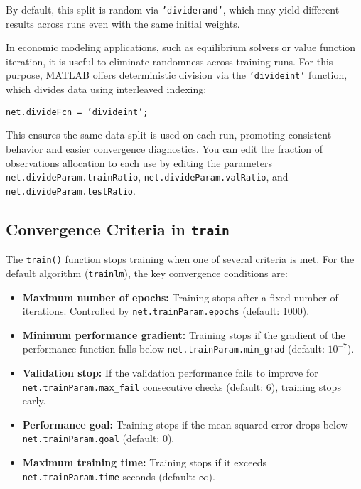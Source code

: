 \documentclass[a4paper,12pt]{article}
\newcommand{\code}[1]{\texttt{#1}}
\begin{document}
By default, this split is random via \code{'dividerand'}, which may yield different results across runs even with the same initial weights.


In economic modeling applications, such as equilibrium solvers or value function iteration, it is useful to eliminate randomness across training runs. For this purpose, MATLAB offers deterministic division via the \code{'divideint'} function, which divides data using interleaved indexing:

\code{net.divideFcn = 'divideint';}

This ensures the same data split is used on each run, promoting consistent behavior and easier convergence diagnostics. You can edit the fraction of observations allocation to each use by editing the parameters \code{net.divideParam.trainRatio}, \code{net.divideParam.valRatio}, and \code{net.divideParam.testRatio}. 


\subsection{Convergence Criteria in \code{train}}

The \code{train()} function stops training when one of several criteria is met. For the default algorithm (\code{trainlm}), the key convergence conditions are:

\begin{itemize}
  \item \textbf{Maximum number of epochs:} Training stops after a fixed number of iterations. Controlled by \code{net.trainParam.epochs} (default: 1000).
  \item \textbf{Minimum performance gradient:} Training stops if the gradient of the performance function falls below \code{net.trainParam.min\_grad} (default: \(10^{-7}\)).
  \item \textbf{Validation stop:} If the validation performance fails to improve for \code{net.trainParam.max\_fail} consecutive checks (default: 6), training stops early.
  \item \textbf{Performance goal:} Training stops if the mean squared error drops below \code{net.trainParam.goal} (default: 0).
  \item \textbf{Maximum training time:} Training stops if it exceeds \code{net.trainParam.time} seconds (default: \(\infty\)).
\end{itemize}
\end{document}
